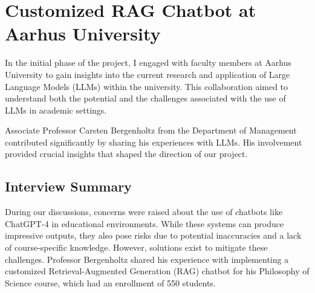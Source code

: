 




\section*{Customized RAG Chatbot at Aarhus University}

In the initial phase of the project, I engaged with faculty members at Aarhus University to gain insights into the current research and application of Large Language Models (LLMs) within the university. This collaboration aimed to understand both the potential and the challenges associated with the use of LLMs in academic settings.

Associate Professor Carsten Bergenholtz from the Department of Management contributed significantly by sharing his experiences with LLMs. His involvement provided crucial insights that shaped the direction of our project.

\subsection*{Interview Summary}

During our discussions, concerns were raised about the use of chatbots like ChatGPT-4 in educational environments. While these systems can produce impressive outputs, they also pose risks due to potential inaccuracies and a lack of course-specific knowledge. However, solutions exist to mitigate these challenges. Professor Bergenholtz shared his experience with implementing a customized Retrieval-Augmented Generation (RAG) chatbot for his Philosophy of Science course, which had an enrollment of 550 students.

